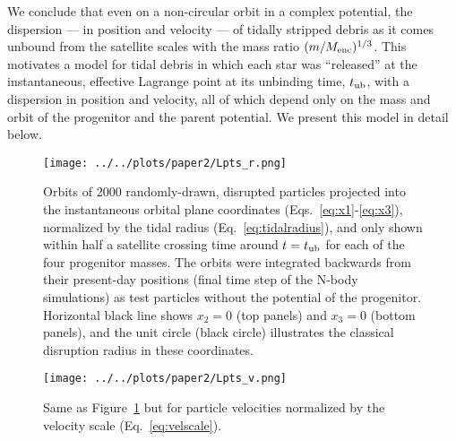 \documentclass{emulateapj}
\newcommand{\tub}{t_{\rm ub}}
\begin{document}
We conclude that even on a non-circular orbit in a complex potential, the dispersion --- in position and velocity --- of tidally stripped debris as it comes unbound from the satellite scales with the mass ratio $(m / M_{\rm enc})^{1/3}$. This motivates a model for tidal debris in which each star was ``released'' at the instantaneous, effective Lagrange point at its unbinding time, $\tub$, with a dispersion in position and velocity, all of which depend only on the mass and orbit of the progenitor and the parent potential. We present this model in detail below.

\begin{figure*}[!ht]
\begin{center}
\texttt{[image: ../../plots/paper2/Lpts\_r.png]}
\caption{ Orbits of 2000 randomly-drawn, disrupted particles projected into the instantaneous orbital plane coordinates (Eqs.~\ref{eq:x1}-\ref{eq:x3}), normalized by the tidal radius (Eq.~\ref{eq:tidalradius}), and only shown within half a satellite crossing time around $t=\tub$ for each of the four progenitor masses. The orbits were integrated backwards from their present-day positions (final time step of the N-body simulations) as test particles without the potential of the progenitor. Horizontal black line shows $x_2=0$ (top panels) and $x_3=0$ (bottom panels), and the unit circle (black circle) illustrates the classical disruption radius in these coordinates. }\label{fig:lpts_r}
\end{center}
\end{figure*}

\begin{figure*}[!ht]
\begin{center}
\texttt{[image: ../../plots/paper2/Lpts\_v.png]}
\caption{ Same as Figure~\ref{fig:lpts_r} but for particle velocities normalized by the velocity scale (Eq.~\ref{eq:velscale}). }\label{fig:lpts_v}
\end{center}
\end{figure*}

\clearpage
\end{document}
